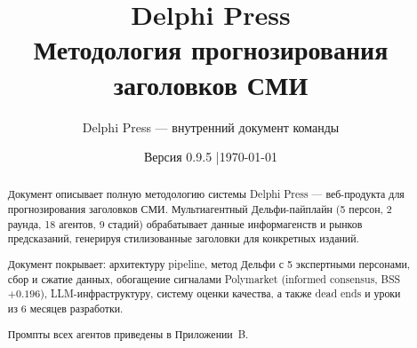 \documentclass[a4paper, 11pt]{article}
\title{%
  Delphi Press\\
  Методология прогнозирования заголовков СМИ%
}
\author{Delphi Press --- внутренний документ команды}
\date{Версия 0.9.5 \quad|\quad \today}
\begin{document}
\maketitle

\begin{abstract}
Документ описывает полную методологию системы Delphi Press ---
веб-продукта для прогнозирования заголовков СМИ.
Мультиагентный Дельфи-пайплайн (5 персон, 2 раунда, 18 агентов, 9 стадий)
обрабатывает данные информагенств и рынков предсказаний,
генерируя стилизованные заголовки для конкретных изданий.

Документ покрывает: архитектуру pipeline, метод Дельфи с 5 экспертными персонами,
сбор и сжатие данных, обогащение сигналами Polymarket (informed consensus, BSS $+0.196$),
LLM-инфраструктуру, систему оценки качества,
а также dead ends и уроки из 6 месяцев разработки.

Промпты всех агентов приведены в Приложении~B.
\end{abstract}

\tableofcontents
\newpage



\newpage


\newpage


\newpage


\newpage


\newpage

\end{document}
